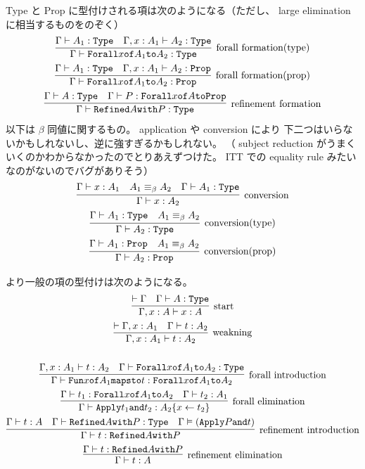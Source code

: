 Type と Prop に型付けされる項は次のようになる（ただし、 large elimination に相当するものをのぞく）
\begin{gather*}
  \infer[\text{forall formation(type)}]{\Gamma \vdash \texttt{Forall} x \texttt{of} A_1 \texttt{to} A_2 : \texttt{Type}}{\Gamma \vdash A_1 : \texttt{Type} & \Gamma , x : A_1 \vdash A_2 : \texttt{Type} } \\
  \infer[\text{forall formation(prop)}]{\Gamma \vdash \texttt{Forall} x \texttt{of} A_1 \texttt{to} A_2 : \texttt{Prop}}{\Gamma \vdash A_1 : \texttt{Type} & \Gamma , x : A_1 \vdash A_2 : \texttt{Prop} } \\
  \infer[\text{refinement formation}]{\Gamma \vdash \texttt{Refined} A \texttt{with} P : \texttt{Type}}{\Gamma \vdash A : \texttt{Type} & \Gamma \vdash P : \texttt{Forall} x \texttt{of} A \texttt{to} \texttt{Prop}} \\
\end{gather*}
  以下は \(\beta\) 同値に関するもの。
  application や conversion により 下二つはいらないかもしれないし、逆に強すぎるかもしれない。
  （ subject reduction がうまくいくのかわからなかったのでとりあえずつけた。 ITT での equality rule みたいなのがないのでバグがありそう）
\begin{gather*}
  \infer[\text{conversion}]{\Gamma \vdash x : A_2}{\Gamma \vdash x : A_1 & A_1 \equiv_{\beta} A_2 & \Gamma \vdash A_1 : \texttt{Type}} \\
  \infer[\text{conversion(type)}]{\Gamma \vdash A_2 : \texttt{Type}}{\Gamma \vdash A_1 : \texttt{Type} & A_1 \equiv_{\beta} A_2} \\
  \infer[\text{conversion(prop)}]{\Gamma \vdash A_2 : \texttt{Prop}}{\Gamma \vdash A_1 : \texttt{Prop} & A_1 \equiv_{\beta} A_2}
\end{gather*}

より一般の項の型付けは次のようになる。
\begin{gather*}
  \infer[\text{start}]{\Gamma , x : A \vdash x : A}{\vdash \Gamma & \Gamma \vdash A : \texttt{Type}} \\
  \infer[\text{weakning}]{\Gamma , x : A_1 \vdash t : A_2}{\vdash \Gamma , x : A_1 & \Gamma \vdash t : A_2} \\
  \\
  \infer[\text{forall introduction}]{\Gamma \vdash \texttt{Fun} x \texttt{of} A_1 \texttt{mapsto} t : \texttt{Forall} x \texttt{of} A_1 \texttt{to} A_2}{\Gamma , x : A_1 \vdash t : A_2 & \Gamma \vdash \texttt{Forall} x \texttt{of} A_1 \texttt{to} A_2 : \texttt{Type}} \\
  \infer[\text{forall elimination}]{\Gamma \vdash \texttt{Apply} t_1 \texttt{and} t_2 : A_2\{x \leftarrow t_2\}}{\Gamma \vdash t_1 : \texttt{Forall} x \texttt{of} A_1 \texttt{to} A_2 & \Gamma \vdash t_2 : A_1} \\
  \infer[\text{refinement introduction}]{\Gamma \vdash t : \texttt{Refined} A \texttt{with} P}{\Gamma \vdash t : A & \Gamma \vdash \texttt{Refined} A \texttt{with} P : \texttt{Type} & \Gamma \vDash (\texttt{Apply} P \texttt{and} t)} \\
  \infer[\text{refinement elimination}]{\Gamma \vdash t : A}{\Gamma \vdash t : \texttt{Refined} A \texttt{with} P}
\end{gather*}

